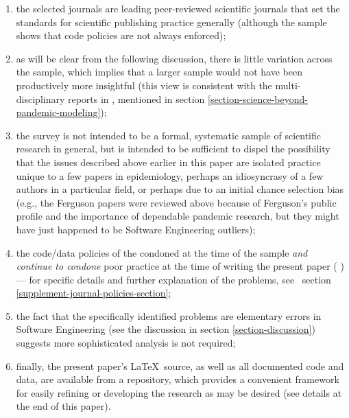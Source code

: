 \documentclass[10pt,a4paper]{article}
\begin{document}
\begin{enumerate}
\item the selected journals are leading peer-reviewed scientific journals that set the standards for scientific publishing practice generally (although the sample shows that code policies are not always enforced); 

\item as will be clear from the following discussion, there is little variation across the sample, which implies that a larger sample would not have been productively more insightful (this view is consistent with the multi-disciplinary reports in \cite{nature-review}, mentioned in section \ref{section-science-beyond-pandemic-modeling}); 

\item the survey is not intended to be a formal, systematic sample of scientific research in general, but is intended to be sufficient to dispel the possibility that the issues described above earlier in this paper are isolated practice unique to a few papers in epidemiology, perhaps an idiosyncrasy of a few authors in a particular field, or perhaps due to an initial chance selection bias (e.g., the Ferguson papers were reviewed above because of Ferguson's public profile and the importance of dependable pandemic research, but they might have just happened to be Software Engineering outliers);

\item the code/data policies of the  condoned at the time of the sample \emph{and continue to condone\/} poor practice at the time of writing the present paper (\monthname{\month} \the\year) --- for specific details and further explanation of the problems, see \supplement\ section \ref{supplement-journal-policies-section};

\item
the fact that the specifically identified problems are elementary errors in Software Engineering (see the discussion in section \ref{section-discussion}) suggests more sophisticated analysis is not required;

\item 
finally, the present paper's \LaTeX\ source, as well as all documented code and data, are available from a repository, which provides a convenient framework for easily refining or developing the research as may be desired (see details at the end of this paper).
\end{enumerate}
\end{document}
